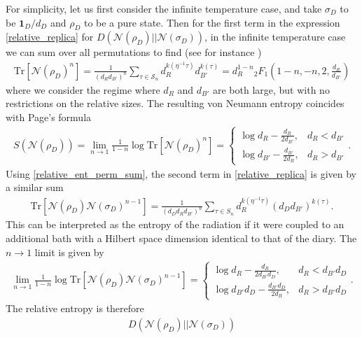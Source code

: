 \documentclass[a4paper,11pt]{article}
\newcommand{\Tr}{\text{Tr}}
\begin{document}
\begin{enumerate}
For simplicity, let us first consider the infinite temperature case, and take $\sigma_D$ to be $\mathbf{1}_D/d_D$ and $\rho_D$ to be a pure state. Then for the first term in the expression \eqref{relative_replica} for $ D(\mathcal{N}(\rho_D) || \mathcal{N}(\sigma_D) )$, in the infinite temperature case we can sum over all permutations to find (see for instance \cite{2020arXiv200801089L})
\begin{align}
 \Tr \left[ \mathcal{N}(\rho_D)^n \right] = \frac{1}{( d_Rd_{B'})^n}\sum_{\tau \in \mathcal{S}_n} d_R^{k(\eta^{-1} \tau) } d_{B'}^{k(\tau)} = d_R^{1-n}{}_2F_1\left( 1-n,-n,2,\frac{d_R}{d_{B'}}\right) 
\end{align}
where we consider the regime where $d_R$ and $d_{B'}$ are both large, but with no restrictions on the relative sizes. 
The resulting von Neumann entropy coincides with Page's formula \cite{1993PhRvL..71.1291P}
\begin{align}
 S(\mathcal{N}(\rho_D)) = \lim_{n \rightarrow 1} \frac{1}{1-n}\log \Tr \left[ \mathcal{N}(\rho_D)^n \right] =
 \begin{cases}\log d_R - \frac{d_R}{2 d_{B'}}, & d_R < d_{B'}
 \\
 \log d_{B'} - \frac{d_{B'}}{2 d_{R}}, & d_R > d_{B'}
 \end{cases}.
 \label{page_formula}
\end{align}
Using \eqref{relative_ent_perm_sum}, the second term in \eqref{relative_replica} is given by a similar sum
\begin{align}
 \Tr \left[\mathcal{N}(\rho_D) \mathcal{N}(\sigma_D)^{n-1} \right]= \frac{1}{(d_D d_Rd_{B'})^n}\sum_{\tau \in S_n} d_R^{k(\eta^{-1} \tau) }\left( d_D d_{B'}\right)^{k(\tau)}.
\end{align}
This can be interpreted as the entropy of the radiation if it were coupled to an additional bath with a Hilbert space dimension identical to that of the diary. The $n\rightarrow 1$ limit is given by 
\begin{align}
 \lim_{n \rightarrow 1} \frac{1}{1-n}\log \Tr \left[ \mathcal{N}(\rho_D) \mathcal{N}(\sigma_D)^{n-1} \right]
 =
 \begin{cases}\log d_R - \frac{d_R}{2 d_{B'}d_D}, & d_R < d_{B'}d_D
 \\
 \log d_{B'}d_D - \frac{d_{B'}d_D}{2 d_{R}}, & d_R > d_{B'}d_D
 \end{cases}.
\end{align}
The relative entropy is therefore
\begin{align}
 D(\mathcal{N}(\rho_D)||\mathcal{N}(\sigma_D)) 

\end{align}
\end{enumerate}
\end{document}
